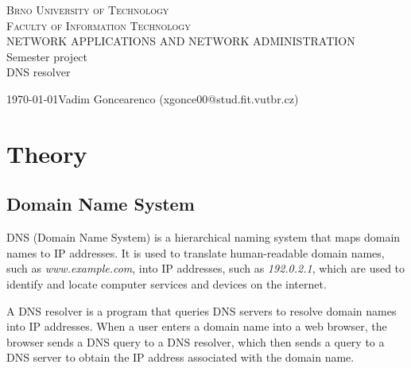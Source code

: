 \documentclass[a4paper, 11pt]{article}
\begin{document}
\begin{center}
    \Huge
    \textsc{Brno University of Technology\\\huge Faculty of Information Technology}\\
    \LARGE
    NETWORK APPLICATIONS AND NETWORK ADMINISTRATION\\\LARGE 
    Semester project\\\Huge
    \Huge DNS resolver\\
\end{center}
{\Large \today \hfill Vadim Goncearenco (xgonce00@stud.fit.vutbr.cz)}
\newpage

\tableofcontents
\newpage



\newcommand{\todo}[1]{\textcolor{orange}{\textbf{[[#1]]}}}
\newcommand{\desc}[1]{\textcolor{gray}{\textbf{[[#1]]}}}


\section{Theory}
    \subsection{Domain Name System}
        DNS (Domain Name System) is a hierarchical naming system that maps domain names to IP addresses.
        It is used to translate human-readable domain names, such as \emph{www.example.com}, into IP addresses, such as \emph{192.0.2.1}, 
        which are used to identify and locate computer services and devices on the internet.\cite{1987}

        A DNS resolver is a program that queries DNS servers to resolve domain names into IP addresses.
        When a user enters a domain name into a web browser, the browser sends a DNS query to a DNS resolver, 
        which then sends a query to a DNS server to obtain the IP address associated with the domain name.
\end{document}
